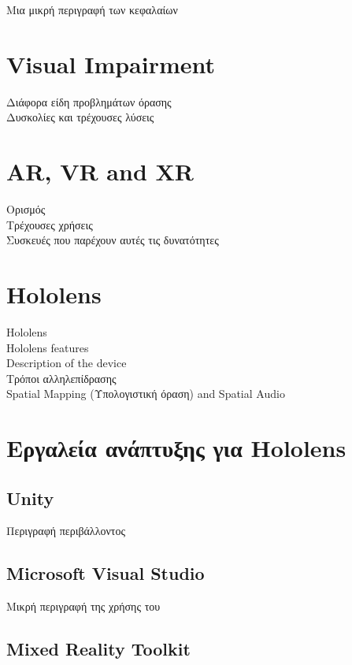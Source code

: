 
Μια μικρή περιγραφή των κεφαλαίων

\section{Visual Impairment}
Διάφορα είδη προβλημάτων όρασης\\
Δυσκολίες και τρέχουσες λύσεις

\section{AR, VR and XR}
Ορισμός\\
Τρέχουσες χρήσεις\\
Συσκευές που παρέχουν αυτές τις δυνατότητες

\section{Hololens}
Hololens\\
Hololens features\\
Description of the device\\
Τρόποι αλληλεπίδρασης\\
Spatial Mapping (Υπολογιστική όραση) and Spatial Audio

\section{Εργαλεία ανάπτυξης για Hololens}

\subsection{Unity}
Περιγραφή περιβάλλοντος

\subsection{Microsoft Visual Studio}
Μικρή περιγραφή της χρήσης του

\subsection{Mixed Reality Toolkit}

